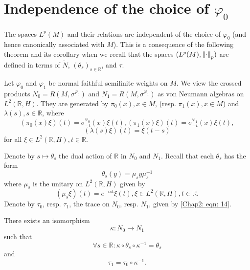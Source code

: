 \section{Independence of the choice of $\varphi_0$}
The spaces $L^p(M)$ and their relations are independent of the choice of $\varphi_0$ (and hence canonically associated with $M$). This is a consequence of the following theorem and its corollary when we recall that the spaces $(L^p(M), \norm{\cdot}_p)$ are defined in terms of $\tilde{N}$, $(\theta_s)_{s\in \mathbb{R}}$, and $\tau$.\par
Let $\varphi_0$ and $\varphi_1$ be normal faithful semifinite weights on $M$. We view the crossed products $N_0=R(M,\sigma^{\varphi_0})$ and $N_1=R(M,\sigma^{\varphi_1})$ as von Neumann algebras on $L^2(\mathbb{R},H)$. They are generated by $\pi_0(x), x\in M$, (resp. $\pi_1(x), x\in M$) and $\lambda(s),s\in \mathbb{R}$, where
\[
    (\pi_0(x)\xi)(t)=\sigma_{-t}^{\varphi_0}(x)\xi(t),(\pi_1(x)\xi)(t)=\sigma_{-t}^{\varphi_1}(x)\xi(t),
\]
\[
    (\lambda(s)\xi)(t)=\xi(t-s)
\]
for all $\xi\in L^2(\mathbb{R},H), t\in \mathbb{R}$.\par
Denote by $s\mapsto \theta_s$ the dual action of $\mathbb{R}$ in $N_0$ and $N_1$. Recall \cite[Section 4]{18} that each $\theta_s$ has the form
\begin{equation}
    \theta_s(y)=\mu_sy\mu_s^{-1}
\end{equation}
where $\mu_s$ is the unitary on $L^2(\mathbb{R},H)$ given by
\begin{equation}\label{Chap2: eqn: 46}
    (\mu_s\xi)(t)=e^{-ist}\xi(t),\xi\in L^2(\mathbb{R},H),t\in \mathbb{R}.
\end{equation}
Denote by $\tau_0$, resp. $\tau_1$, the trace on $N_0$, resp. $N_1$, given by \eqref{Chap2: eqn: 14}.
\begin{theorem}
    There exists an isomorphism
    \[
        \kappa:N_0\to N_1
    \]
    such that
    \begin{equation}\label{Chap2: eqn: 47}
        \forall s\in \mathbb{R}:\kappa\circ\theta_s\circ\kappa^{-1}=\theta_s
    \end{equation}
    and
    \begin{equation}
        \tau_1=\tau_0\circ\kappa^{-1}.
    \end{equation}
\end{theorem}
